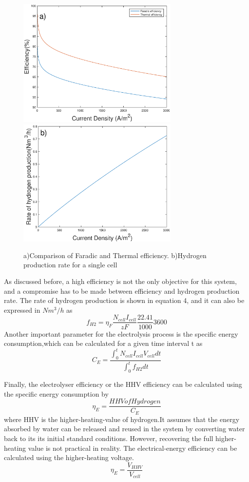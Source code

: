 \begin{figure}[H]
\includegraphics[width=8cm]{efficiency.eps} 
\includegraphics[width=8cm]{rate.eps}
\caption{a)Comparison of Faradic and Thermal efficiency. b)Hydrogen production rate for a single cell}
\end{figure} 

As discussed before, a high efficiency is not the only objective for this system, and a compromise has to be made between efficiency and hydrogen production rate. The rate of hydrogen production is shown in equation 4, and it can also be expressed in $Nm^3/h$ as
\begin{equation} 
 f_{H2} = \eta_F \frac{N_{cell}I_{cell}}{zF}\frac{22.41}{1000}3600
\end{equation} 
Another important parameter for the electrolysis process is the specific energy consumption,which can be calculated for a given time interval t as
\begin{equation}
C_E = \frac{\int_{0}^{t} N_{cell}  {I_{cell}}  V_{cell} dt}{\int_{0}^{t} f_{H2}dt}
\end{equation}

Finally, the electrolyser efficiency or the HHV efficiency can be calculated using the specific energy consumption by
\begin{equation}
\eta_E = \frac{HHV of Hydrogen}{C_E} 
\end{equation}
where HHV is the higher-heating-value of hydrogen.It assumes that the energy absorbed by water can be released and reused in the system by converting water back to its its initial standard conditions. However, recovering the full higher-heating value is not practical in reality.
The electrical-energy efficiency can be calculated using the higher-heating voltage.\cite{efficiency} \cite{efficiency2} 
\begin{equation}
\eta_E=\frac{V_{HHV}}{V_{cell}}
\end{equation}

